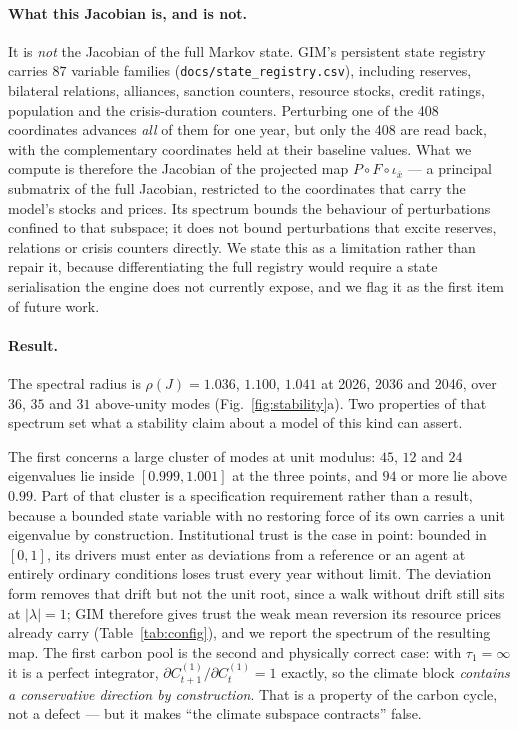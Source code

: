\documentclass[12pt,a4paper]{article}
\newcommand{\rhoA}{1.036} \newcommand{\rhoB}{1.100} \newcommand{\rhoC}{1.041}
\newcommand{\nModesA}{36} \newcommand{\nModesB}{35} \newcommand{\nModesC}{31}
\newcommand{\nStateJac}{408}
\begin{document}
\paragraph{What this Jacobian is, and is not.} It is \emph{not} the Jacobian of the full
Markov state. GIM's persistent state registry carries $87$ variable families
(\texttt{docs/state\_registry.csv}), including reserves, bilateral relations, alliances,
sanction counters, resource stocks, credit ratings, population and the crisis-duration
counters. Perturbing one of the \nStateJac{} coordinates advances \emph{all} of them for one
year, but only the \nStateJac{} are read back, with the complementary coordinates held at
their baseline values. What we compute is therefore the Jacobian of the projected map
$P\circ F\circ\iota_{\bar x}$ --- a principal submatrix of the full Jacobian, restricted to
the coordinates that carry the model's stocks and prices. Its spectrum bounds the behaviour of
perturbations confined to that subspace; it does not bound perturbations that excite reserves,
relations or crisis counters directly. We state this as a limitation rather than repair it,
because differentiating the full registry would require a state serialisation the engine does
not currently expose, and we flag it as the first item of future work.

\paragraph{Result.} The spectral radius is $\rho(J)=\rhoA$, $\rhoB$, $\rhoC$ at 2026, 2036 and
2046, over $\nModesA$, $\nModesB$ and $\nModesC$ above-unity modes
(Fig.~\ref{fig:stability}a). Two properties of that spectrum set what a stability claim about
a model of this kind can assert.

The first concerns a large cluster of modes at unit modulus: $45$, $12$ and $24$ eigenvalues
lie inside $[0.999,1.001]$ at the three points, and $94$ or more lie above $0.99$. Part of that
cluster is a specification requirement rather than a result, because a bounded state variable
with no restoring force of its own carries a unit eigenvalue by construction. Institutional
trust is the case in point: bounded in $[0,1]$, its drivers must enter as deviations from a
reference or an agent at entirely ordinary conditions loses trust every year without limit. The
deviation form removes that drift but not the unit root, since a walk without drift still sits
at $|\lambda|=1$; GIM therefore gives trust the weak mean reversion its resource prices already
carry (Table~\ref{tab:config}), and we report the spectrum of the resulting map. The first
carbon pool is the second and physically correct case: with $\tau_1=\infty$ it is a perfect
integrator, $\partial C^{(1)}_{t+1}/\partial C^{(1)}_t = 1$ exactly, so the climate block
\emph{contains a conservative direction by construction}. That is a property of the carbon
cycle, not a defect --- but it makes ``the climate subspace contracts'' false.
\end{document}

